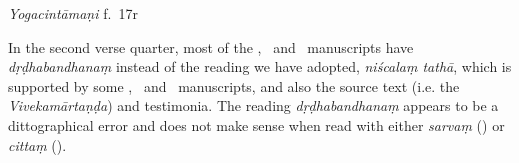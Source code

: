 \begin{ekdosis}
\begin{testimonia}[hp02_002]
\begin{versinnote}
\end{versinnote}

\emph{Yogacintāmaṇi} f.~17r

\begin{versinnote}
\end{versinnote}

\end{testimonia}

\begin{philcomm}[hp02_002]
In the second verse quarter, most of the \textalpha, \textbeta\ and \textgamma\ manuscripts have \emph{dṛḍhabandhanaṃ} instead of the reading we have adopted, \emph{niścalaṃ tathā}, which is supported by some \textbeta, \textdelta\ and \texteta\ manuscripts, and also the source text (i.e. the \emph{Vivekamārtaṇḍa}) and testimonia. The reading \emph{dṛḍhabandhanaṃ} appears to be a dittographical error and does not make sense when read with either \emph{sarvaṃ} (\textalpha) or \emph{cittaṃ} (\textgamma). \lb


\end{philcomm}
\end{ekdosis}
